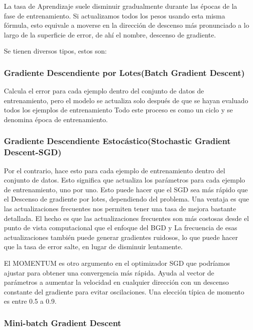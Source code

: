 		La tasa de Aprendizaje suele disminuir gradualmente durante las épocas de la fase de entrenamiento. Si actualizamos todos los pesos usando esta misma fórmula, esto equivale a moverse en la dirección de descenso más pronunciado a lo largo de la superficie de error, de ahí el nombre, descenso de gradiente.

		Se tienen diversos tipos, estos son:
		\subsubsection{Gradiente Descendiente por Lotes(Batch Gradient Descent)}
		
			Calcula el error para cada ejemplo dentro del conjunto de datos de entrenamiento, pero el modelo se actualiza solo después de que se hayan evaluado todos los ejemplos de entrenamiento Todo este proceso es como un ciclo y se denomina época de entrenamiento.

		\subsubsection{Gradiente Descendiente Estocástico(Stochastic Gradient Descent-SGD)}

			Por el contrario, hace esto para cada ejemplo de entrenamiento dentro del conjunto de datos. Esto significa que actualiza los parámetros para cada ejemplo de entrenamiento, uno por uno. Esto puede hacer que el SGD sea más rápido que el Descenso de gradiente por lotes, dependiendo del problema. Una ventaja es que las actualizaciones frecuentes nos permiten tener una tasa de mejora bastante detallada. El hecho es que las actualizaciones frecuentes son más costosas desde el punto de vista computacional que el enfoque del BGD y La frecuencia de esas actualizaciones también puede generar gradientes ruidosos, lo que puede hacer que la tasa de error salte, en lugar de disminuir lentamente.

			El MOMENTUM es otro argumento en el optimizador SGD que podríamos ajustar para obtener una convergencia más rápida. Ayuda al vector de parámetros a aumentar la velocidad en cualquier dirección con un descenso constante del gradiente para evitar oscilaciones. Una elección típica de momento es entre 0.5 a 0.9.

		\subsubsection{Mini-batch Gradient Descent}

